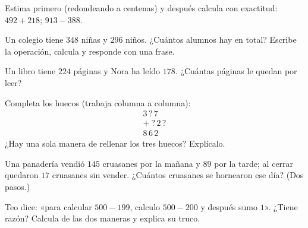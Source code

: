 \begin{exercise}[$\star$]\label{exo:g3:addsub:6}
Estima primero (redondeando a centenas) y después calcula con exactitud:
$492 + 218$; \quad $913 - 388$.
\end{exercise}

\begin{exercise}[$\star$]\label{exo:g3:addsub:7}
Un colegio tiene $348$ niñas y $296$ niños. ¿Cuántos alumnos hay en total?
Escribe la operación, calcula y responde con una frase.
\end{exercise}

\begin{exercise}[$\star$]\label{exo:g3:addsub:8}
Un libro tiene $224$ páginas y Nora ha leído $178$. ¿Cuántas páginas le
quedan por leer?
\end{exercise}

\begin{exercise}[$\star$]\label{exo:g3:addsub:9}
Completa los huecos (trabaja columna a columna):
\[
\begin{array}{r}
3\,?\,7 \\
+\ ?\,2\,? \\
\hline
8\,6\,2
\end{array}
\]
¿Hay una sola manera de rellenar los tres huecos? Explícalo.
\end{exercise}

\begin{exercise}[$\star\star$]\label{exo:g3:addsub:10}
Una panadería vendió $145$ cruasanes por la mañana y $89$ por la
tarde; al cerrar quedaron $17$ cruasanes sin vender. ¿Cuántos
cruasanes se hornearon ese día? (Dos pasos.)
\end{exercise}

\begin{exercise}[$\star\star$]\label{exo:g3:addsub:11}
Teo dice: «para calcular $500 - 199$, calculo $500 - 200$ y después
sumo $1$». ¿Tiene razón? Calcula de las dos maneras y explica su truco.
\end{exercise}

